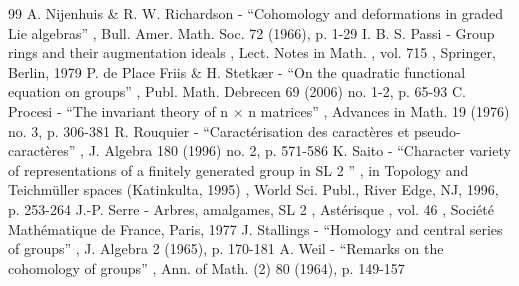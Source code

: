 \documentclass[11pt]{article}
\theoremstyle{definition}
\begin{document}
\begin{thebibliography}{99}
 A. Nijenhuis \& R. W. Richardson - “Cohomology and deformations in graded Lie algebras” , Bull. Amer. Math. Soc. 72 (1966), p. 1-29
 I. B. S. Passi - Group rings and their augmentation ideals , Lect. Notes in Math. , vol. 715 , Springer, Berlin, 1979
 P. de Place Friis \& H. Stetkær - “On the quadratic functional equation on groups” , Publ. Math. Debrecen 69 (2006) no. 1-2, p. 65-93
 C. Procesi - “The invariant theory of n × n matrices” , Advances in Math. 19 (1976) no. 3, p. 306-381
 R. Rouquier - “Caractérisation des caractères et pseudo-caractères” , J. Algebra 180 (1996) no. 2, p. 571-586
 K. Saito - “Character variety of representations of a finitely generated group in SL 2 ” , in Topology and Teichmüller spaces (Katinkulta, 1995) , World Sci. Publ., River Edge, NJ, 1996, p. 253-264
 J.-P. Serre - Arbres, amalgames, SL 2 , Astérisque , vol. 46 , Société Mathématique de France, Paris, 1977
 J. Stallings - “Homology and central series of groups” , J. Algebra 2 (1965), p. 170-181
 A. Weil - “Remarks on the cohomology of groups” , Ann. of Math. (2) 80 (1964), p. 149-157
\end{thebibliography}
\end{document}
